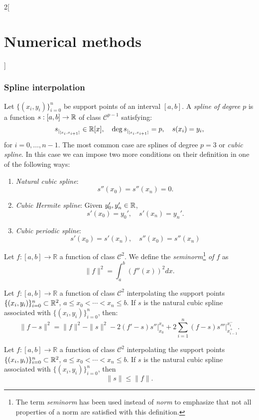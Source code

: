 \documentclass[../../../main.tex]{subfiles}
\begin{document}
\begin{multicols}{2}[\section{Numerical methods}]
\subsubsection*{Spline interpolation}
\begin{definition}[Spline]
Let $\{(x_i,y_i)\}_{i=0}^n$ be support points of an interval $[a,b]$. A \textit{spline of degree $p$} is a function $s:[a,b]\rightarrow\mathbb{R}$ of class $\mathcal{C}^{p-1}$ satisfying: $$s_{{|_{[x_i,x_{i+1}]}}}\in\mathbb{R}[x],\quad\deg s_{|_{[x_i,x_{i+1}]}}=p,\quad s(x_i)=y_i,$$ for $i=0,\ldots,n-1$. The most common case are splines of degree  $p=3$ or \textit{cubic spline}. In this case we can impose two more conditions on their definition in one of the following ways:
\begin{enumerate}
    \item \textit{Natural cubic spline}: $$s''(x_0)=s''(x_n)=0.$$
    \item \textit{Cubic Hermite spline}: Given $y_0',y_n'\in\mathbb{R}$, $$s'(x_0)=y_0',\quad s'(x_n)=y_n'.$$
    \item \textit{Cubic periodic spline}: $$s'(x_0)=s'(x_n),\quad s''(x_0)=s''(x_n)$$
\end{enumerate}
\end{definition}
\begin{definition}
Let $f:[a,b]\rightarrow\mathbb{R}$ a function of class $\mathcal{C}^2$. We define the \textit{seminorm}\footnote{The term \textit{seminorm} has been used instead of \textit{norm} to emphasize that not all properties of a norm are satisfied with this definition.} \textit{of $f$} as $$\|f\|^2=\int_a^b(f''(x))^2dx.$$
\end{definition}
\begin{prop}
Let $f:[a,b]\rightarrow\mathbb{R}$ a function of class $\mathcal{C}^2$ interpolating the support points $\{(x_i,y_i)\}_{i=0}^n\subset\mathbb{R}^2$, $a\leq x_0<\cdots<x_n\leq b$. If $s$ is the natural cubic spline associated with $\{(x_i,y_i)\}_{i=0}^n$, then: $$\|f-s\|^2=\|f\|^2-\|s\|^2-2(f'-s)s''\Big|_{x_0}^{x_n}+2\sum_{i=1}^n(f-s)s'''\Big|_{x_{i-1}^+}^{x_i^-}.$$
\end{prop}
\begin{theorem}
Let $f:[a,b]\rightarrow\mathbb{R}$ a function of class $\mathcal{C}^2$ interpolating the support points $\{(x_i,y_i)\}_{i=0}^n\subset\mathbb{R}^2$, $a\leq x_0<\cdots<x_n\leq b$. If $s$ is the natural cubic spline associated with $\{(x_i,y_i)\}_{i=0}^n$, then $$\|s\|\leq\|f\|.$$
\end{theorem}

\end{multicols}
\end{document}
